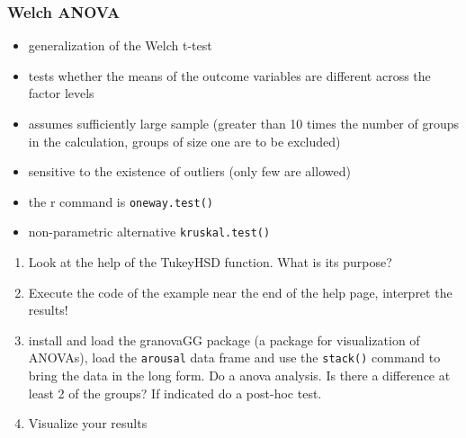 \begin{frame}[allowframebreaks]\frametitle{Welch ANOVA}
\begin{itemize}
\item generalization of the Welch t-test
\item tests whether the means of the outcome variables are different across the factor levels
\item assumes sufficiently large sample (greater than 10 times the number of groups in the calculation, groups of size one are to be excluded)
\item sensitive to the existence of outliers (only few are allowed)
\item the r command is \texttt{oneway.test()}
\item non-parametric alternative \texttt{kruskal.test()}
\end{itemize}
\end{frame}


\begin{frame}
  \begin{enumerate}
  \item Look at the help of the TukeyHSD function. What is its purpose? 
  \item Execute the code of the example near the end of the help page, interpret the results!
  \item install and load the granovaGG package (a package for visualization of ANOVAs), load the \texttt{arousal} data frame and use the \texttt{stack()} command to bring the data in the long form. Do a anova analysis. Is there a difference at least 2 of the groups? If indicated do a post-hoc test.
  \item Visualize your results
  \end{enumerate}
\end{frame}



